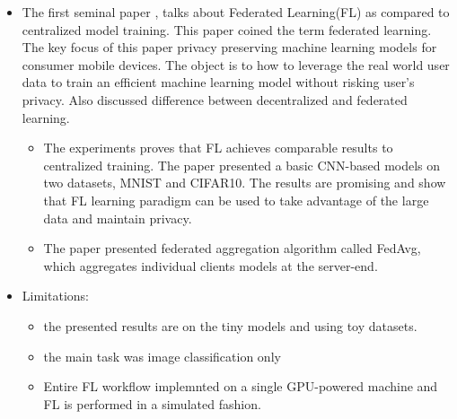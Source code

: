 \documentclass[thesis]{mas_proposal}
\begin{document}
\begin{itemize}
      \item The first seminal paper \cite{mcmahan2017communication} , talks about Federated Learning(FL) as compared to centralized model training. This paper coined the term federated learning. The key focus of this paper privacy preserving machine learning models for consumer mobile devices. The object is to how to leverage the real world user data to train an efficient machine learning model without risking user's privacy. Also discussed difference between decentralized and federated learning.
      \begin{itemize}
            \item The experiments proves that FL achieves comparable results to centralized training. The paper presented a basic CNN-based models on two datasets, MNIST and CIFAR10. The results are promising and show that FL learning paradigm can be used to take advantage of the large data and maintain privacy.
            \item The paper presented federated aggregation algorithm called FedAvg, which aggregates individual clients models at the server-end.
      \end{itemize}
      \item Limitations: 
      \begin{itemize}
            \item the presented results are on the tiny models and using toy datasets.
            \item the main task was image classification only
            \item Entire FL workflow implemnted on a single GPU-powered machine and FL is performed in a simulated fashion.
      \end{itemize}
      
\end{itemize}
\end{document}
